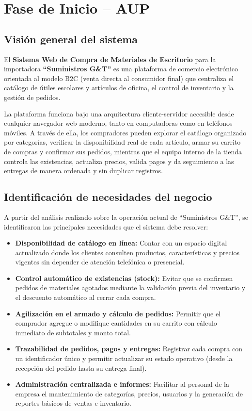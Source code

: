 \section{Fase de Inicio -- AUP}

\subsection{Visión general del sistema}
El \textbf{Sistema Web de Compra de Materiales de Escritorio} para la importadora \textbf{``Suministros G\&T''} es una plataforma de comercio electrónico orientada al modelo B2C (venta directa al consumidor final) que centraliza el catálogo de útiles escolares y artículos de oficina, el control de inventario y la gestión de pedidos.

La plataforma funciona bajo una arquitectura cliente-servidor accesible desde cualquier navegador web moderno, tanto en computadoras como en teléfonos móviles. A través de ella, los compradores pueden explorar el catálogo organizado por categorías, verificar la disponibilidad real de cada artículo, armar su carrito de compras y confirmar sus pedidos, mientras que el equipo interno de la tienda controla las existencias, actualiza precios, valida pagos y da seguimiento a las entregas de manera ordenada y sin duplicar registros.

\subsection{Identificación de necesidades del negocio}
A partir del análisis realizado sobre la operación actual de ``Suministros G\&T'', se identificaron las principales necesidades que el sistema debe resolver:
\begin{itemize}
    \item \textbf{Disponibilidad de catálogo en línea:} Contar con un espacio digital actualizado donde los clientes consulten productos, características y precios vigentes sin depender de atención telefónica o presencial.
    \item \textbf{Control automático de existencias (stock):} Evitar que se confirmen pedidos de materiales agotados mediante la validación previa del inventario y el descuento automático al cerrar cada compra.
    \item \textbf{Agilización en el armado y cálculo de pedidos:} Permitir que el comprador agregue o modifique cantidades en su carrito con cálculo inmediato de subtotales y monto total.
    \item \textbf{Trazabilidad de pedidos, pagos y entregas:} Registrar cada compra con un identificador único y permitir actualizar su estado operativo (desde la recepción del pedido hasta su entrega final).
    \item \textbf{Administración centralizada e informes:} Facilitar al personal de la empresa el mantenimiento de categorías, precios, usuarios y la generación de reportes básicos de ventas e inventario.
\end{itemize}

